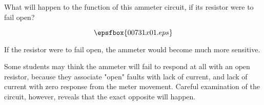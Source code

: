 

What will happen to the function of this ammeter circuit, if its resistor were to fail open?

$$\epsfbox{00731x01.eps}$$







If the resistor were to fail open, the ammeter would become much more sensitive.







Some students may think the ammeter will fail to respond at all with an open resistor, because they associate "open" faults with lack of current, and lack of current with zero response from the meter movement.  Careful examination of the circuit, however, reveals that the exact opposite will happen.



